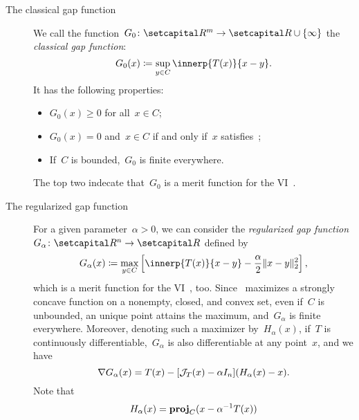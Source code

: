 \documentclass[../../main]{subfiles}
\begin{document}
\begin{example} 
    \begin{description}
        \item[The classical gap function~\cite{Auslender1976,Hearn1982}]
            We call the function~$G_0 \colon \setR^m \to \setR \cup \set{\infty}$ the \emph{classical gap function}:
            \begin{equation} \label{eq:gap}
                G_0(x) \coloneqq \sup_{y \in C} \innerp{T(x)}{x - y}
            .\end{equation} 
            It has the following properties:
            \begin{itemize}
                \item $G_0(x) \ge 0$ for all~$x \in C$;
                \item $G_0(x) = 0$ and~$x \in C$ if and only if~$x$ satisfies~;
                \item If~$C$ is bounded,~$G_0$ is finite everywhere.
            \end{itemize}
            The top two indecate that~$G_0$ is a merit function for the VI~.
        \item[The regularized gap function~\cite{Fukushima1992,Auchmuty1989}]
            For a given parameter~$\alpha > 0$, we can consider the \emph{regularized gap function}~$G_\alpha \colon \setR^n \to \setR$ defined by
            \begin{equation} \label{eq:reg_gap}
                G_\alpha(x) \coloneqq \max_{y \in C} \left[ \innerp{T(x)}{x - y} - \frac{\alpha}{2} \norm{x - y}_2^2 \right] 
            ,\end{equation} 
            which is a merit function for the VI~, too.
            Since~ maximizes a strongly concave function on a nonempty, closed, and convex set, even if~$C$ is unbounded, an unique point attains the maximum, and~$G_\alpha$ is finite everywhere.
            Moreover, denoting such a maximizer by~$H_\alpha(x)$, if~$T$ is continuously differentiable,~$G_\alpha$ is also differentiable at any point~$x$, and we have
            \begin{equation}
                \nabla G_\alpha(x) = T(x) - [ \mathcal{J}_{T}(x) - \alpha I_n ] (H_\alpha(x) - x)
            .\end{equation} 
            Note that
            \begin{equation}
                H_\alpha(x) = \proj_C(x - \alpha^{-1} T(x))

\end{equation}
\end{description}
\end{example}
\end{document}
